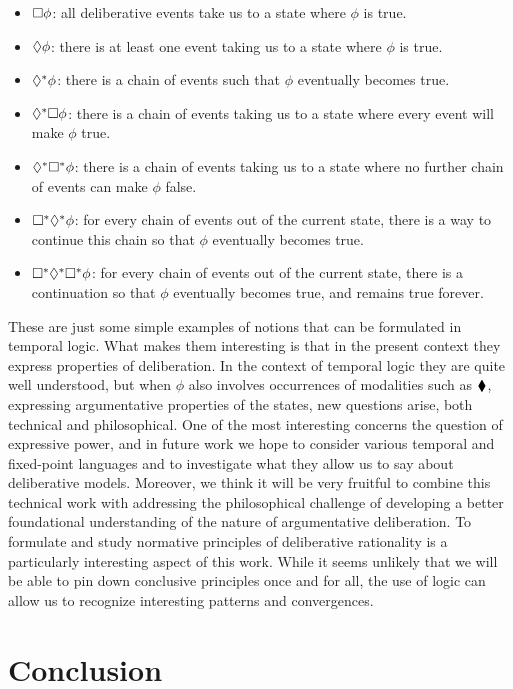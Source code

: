 \documentclass[greybox]{svmult}
\begin{document}
\begin{itemize}
\item $\square \phi$: all deliberative events take us to a state where $\phi$ is true.
\item $\lozenge \phi$: there is at least one event taking us to a state where $\phi$ is true.
\item $\lozenge^\ast \phi$: there is a chain of events such that $\phi$ eventually becomes true.
\item $\lozenge^\ast \square \phi$: there is a chain of events taking us to a state where every event will make $\phi$ true.
\item $\lozenge^\ast \square^\ast \phi$: there is a chain of events taking us to a state where no further chain of events can make $\phi$ false.
\item $\square^\ast \lozenge^\ast \phi$: for every chain of events out of the current state, there is a way to continue this chain so that $\phi$ eventually becomes true.
\item $\square^\ast \lozenge^\ast \square^\ast \phi$: for every chain of events out of the current state, there is a continuation so that $\phi$ eventually becomes true, and remains true forever.
\end{itemize}

These are just some simple examples of notions that can be formulated in temporal logic. What makes them interesting is that in the present context they express properties of deliberation. In the context of temporal logic they are quite well understood, but when $\phi$ also involves occurrences of modalities such as $\blacklozenge$, expressing argumentative properties of the states, new questions arise, both technical and philosophical. One of the most interesting concerns the question of expressive power, and in future work we hope to consider various temporal and fixed-point languages and to investigate what they allow us to say about deliberative models. Moreover, we think it will be very fruitful to combine this technical work with addressing the philosophical challenge of developing a better foundational understanding of the nature of argumentative deliberation. To formulate and study normative principles of deliberative rationality is a particularly interesting aspect of this work. While it seems unlikely that we will be able to pin down conclusive principles once and for all, the use of logic can allow us to recognize interesting patterns and convergences.

\section{Conclusion}\label{sec:conc}



\end{document}
